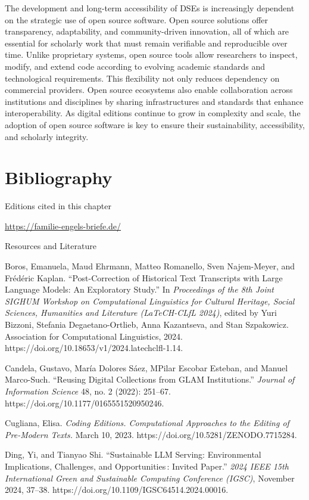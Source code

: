 \documentclass[
  letterpaper,
  DIV=11,
  numbers=noendperiod]{scrreprt}
\begin{document}
The development and long-term accessibility of DSEs is increasingly
dependent on the strategic use of open source software. Open source
solutions offer transparency, adaptability, and community-driven
innovation, all of which are essential for scholarly work that must
remain verifiable and reproducible over time. Unlike proprietary
systems, open source tools allow researchers to inspect, modify, and
extend code according to evolving academic standards and technological
requirements. This flexibility not only reduces dependency on commercial
providers. Open source ecosystems also enable collaboration across
institutions and disciplines by sharing infrastructures and standards
that enhance interoperability. As digital editions continue to grow in
complexity and scale, the adoption of open source software is key to
ensure their sustainability, accessibility, and scholarly integrity.
\hl{}

\section{Bibliography}\label{bibliography-5}

Editions cited in this chapter

\url{https://familie-engels-briefe.de/}

Resources and Literature

Boros, Emanuela, Maud Ehrmann, Matteo Romanello, Sven Najem-Meyer, and
Frédéric Kaplan. ``Post-Correction of Historical Text Transcripts with
Large Language Models: An Exploratory Study.'' In \emph{Proceedings of
the 8th Joint SIGHUM Workshop on Computational Linguistics for Cultural
Heritage, Social Sciences, Humanities and Literature (LaTeCH-CLfL
2024)}, edited by Yuri Bizzoni, Stefania Degaetano-Ortlieb, Anna
Kazantseva, and Stan Szpakowicz. Association for Computational
Linguistics, 2024. https://doi.org/10.18653/v1/2024.latechclfl-1.14.

Candela, Gustavo, María Dolores Sáez, MPilar Escobar Esteban, and Manuel
Marco-Such. ``Reusing Digital Collections from GLAM Institutions.''
\emph{Journal of Information Science} 48, no. 2 (2022): 251--67.
https://doi.org/10.1177/0165551520950246.

Cugliana, Elisa. \emph{Coding Editions. Computational Approaches to the
Editing of Pre-Modern Texts.} March 10, 2023.
https://doi.org/10.5281/ZENODO.7715284.

Ding, Yi, and Tianyao Shi. ``Sustainable LLM Serving: Environmental
Implications, Challenges, and Opportunities\,: Invited Paper.''
\emph{2024 IEEE 15th International Green and Sustainable Computing
Conference (IGSC)}, November 2024, 37--38.
https://doi.org/10.1109/IGSC64514.2024.00016.
\end{document}
